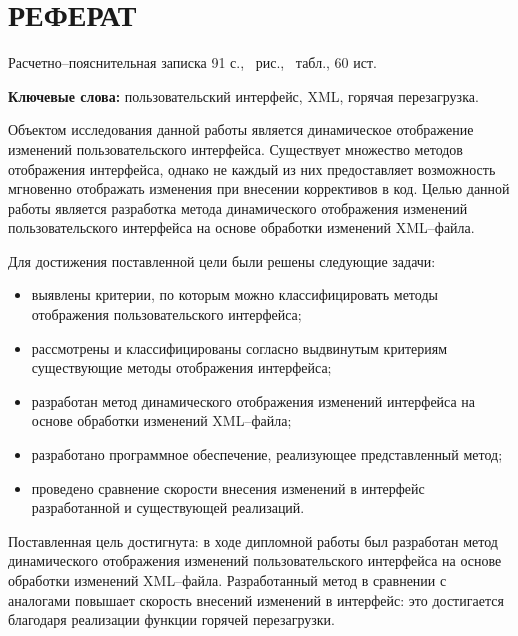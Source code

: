 \section*{РЕФЕРАТ}

Расчетно--пояснительная записка 91 с., \totalfigures\ рис., \totaltables\ табл., 60 ист.

\textbf{Ключевые слова:} пользовательский интерфейс, XML, горячая перезагрузка.

Объектом исследования данной работы является динамическое отображение изменений пользовательского интерфейса.
Существует множество методов отображения интерфейса, однако не каждый из них предоставляет возможность мгновенно отображать изменения при внесении коррективов в код. 
Целью данной работы является разработка метода динамического отображения изменений пользовательского интерфейса на основе обработки изменений XML--файла.

Для достижения поставленной цели были решены следующие задачи:
\begin{itemize}[label=---]
	\item выявлены критерии, по которым можно классифицировать методы отображения пользовательского интерфейса;
	\item рассмотрены и классифицированы согласно выдвинутым критериям существующие методы отображения интерфейса;
	\item разработан метод динамического отображения изменений интерфейса на основе обработки изменений XML--файла;
	\item разработано программное обеспечение, реализующее представленный метод;
	\item проведено сравнение скорости внесения изменений в интерфейс разработанной и существующей реализаций.
\end{itemize}

Поставленная цель достигнута: в ходе дипломной работы был разработан метод динамического отображения изменений пользовательского интерфейса на основе обработки изменений XML--файла.
Разработанный метод в сравнении с аналогами повышает скорость внесений изменений в интерфейс: это достигается благодаря реализации функции горячей перезагрузки.


\pagebreak